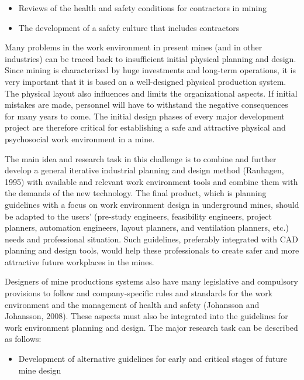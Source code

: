 \documentclass[
  12pt,
]{scrbook}
\providecommand{\tightlist}{%
  \setlength{\itemsep}{0pt}\setlength{\parskip}{0pt}}
\begin{document}
\begin{itemize}
\item
  Reviews of the health and safety conditions for contractors in mining
\item
  The development of a safety culture that includes contractors
\end{itemize}

Many problems in the work environment in present mines (and in other industries) can be traced back to insufficient initial physical planning and design. Since mining is characterized by huge investments and long-term operations, it is very important that it is based on a well-designed physical production system. The physical layout also influences and limits the organizational aspects. If initial mistakes are made, personnel will have to withstand the negative consequences for many years to come. The initial design phases of every major development project are therefore critical for establishing a safe and attractive physical and psychosocial work environment in a mine.

The main idea and research task in this challenge is to combine and further develop a general iterative industrial planning and design method (Ranhagen, 1995) with available and relevant work environment tools and combine them with the demands of the new technology. The final product, which is planning guidelines with a focus on work environment design in underground mines, should be adapted to the users' (pre-study engineers, feasibility engineers, project planners, automation engineers, layout planners, and ventilation planners, etc.) needs and professional situation. Such guidelines, preferably integrated with CAD planning and design tools, would help these professionals to create safer and more attractive future workplaces in the mines.

Designers of mine productions systems also have many legislative and compulsory provisions to follow and company-specific rules and standards for the work environment and the management of health and safety (Johansson and Johansson, 2008). These aspects must also be integrated into the guidelines for work environment planning and design. The major research task can be described as follows:

\begin{itemize}
\tightlist
\item
  Development of alternative guidelines for early and critical stages of future mine design
\end{itemize}
\end{document}
